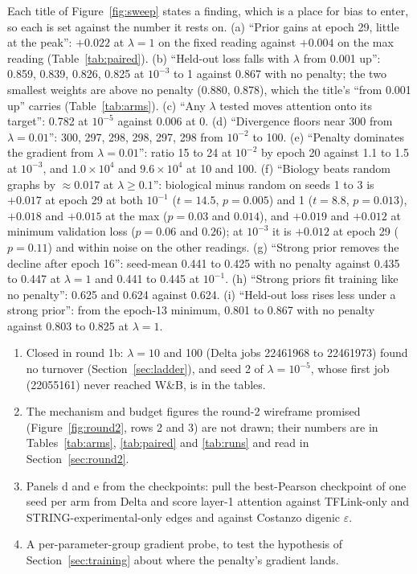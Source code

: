 Each title of Figure~\ref{fig:sweep} states a finding, which is a place for bias to
enter, so each is set against the number it rests on. (a) ``Prior gains at epoch 29,
little at the peak'': $+0.022$ at $\lambda = 1$ on the fixed reading against $+0.004$ on
the max reading (Table~\ref{tab:paired}). (b) ``Held-out loss falls with $\lambda$ from
0.001 up'': 0.859, 0.839, 0.826, 0.825 at $10^{-3}$ to 1 against 0.867 with no penalty;
the two smallest weights are above no penalty (0.880, 0.878), which the title's ``from
0.001 up'' carries (Table~\ref{tab:arms}). (c) ``Any $\lambda$ tested moves attention
onto its target'': 0.782 at $10^{-5}$ against 0.006 at 0. (d) ``Divergence floors near
300 from $\lambda = 0.01$'': 300, 297, 298, 298, 297, 298 from $10^{-2}$ to 100. (e)
``Penalty dominates the gradient from
$\lambda = 0.01$'': ratio 15 to 24 at $10^{-2}$ by epoch 20 against 1.1 to 1.5 at
$10^{-3}$, and $1.0 \times 10^{4}$ and $9.6 \times 10^{4}$ at 10 and 100. (f) ``Biology beats random graphs by $\approx$0.017 at $\lambda \geq 0.1$'':
biological minus random on seeds 1 to 3 is $+0.017$ at epoch 29 at both $10^{-1}$
($t = 14.5$, $p = 0.005$) and 1 ($t = 8.8$, $p = 0.013$), $+0.018$ and $+0.015$ at the
max ($p = 0.03$ and $0.014$), and $+0.019$ and $+0.012$ at minimum validation loss
($p = 0.06$ and $0.26$); at $10^{-3}$ it is $+0.012$ at epoch 29 ($p = 0.11$) and within
noise on the other readings. (g)
``Strong prior removes the decline after epoch 16'': seed-mean 0.441 to 0.425 with no
penalty against 0.435 to 0.447 at $\lambda = 1$ and 0.441 to 0.445 at $10^{-1}$. (h)
``Strong priors fit training like no penalty'': 0.625 and 0.624 against 0.624. (i)
``Held-out loss rises less under a strong prior'': from the epoch-13 minimum, 0.801 to
0.867 with no penalty against 0.803 to 0.825 at $\lambda = 1$.

\begin{enumerate}
\item Closed in round 1b: $\lambda = 10$ and 100 (Delta jobs 22461968 to 22461973)
  found no turnover (Section~\ref{sec:ladder}), and seed 2 of $\lambda = 10^{-5}$,
  whose first job (22055161) never reached W\&B, is in the tables.
\item The mechanism and budget figures the round-2 wireframe promised
  (Figure~\ref{fig:round2}, rows 2 and 3) are not drawn; their numbers are in
  Tables~\ref{tab:arms}, \ref{tab:paired} and \ref{tab:runs} and read in
  Section~\ref{sec:round2}.
\item Panels d and e from the checkpoints: pull the best-Pearson checkpoint of one seed
  per arm from Delta and score layer-1 attention against TFLink-only and
  STRING-experimental-only edges and against Costanzo digenic $\varepsilon$.
\item A per-parameter-group gradient probe, to test the hypothesis of
  Section~\ref{sec:training} about where the penalty's gradient lands.
\end{enumerate}

